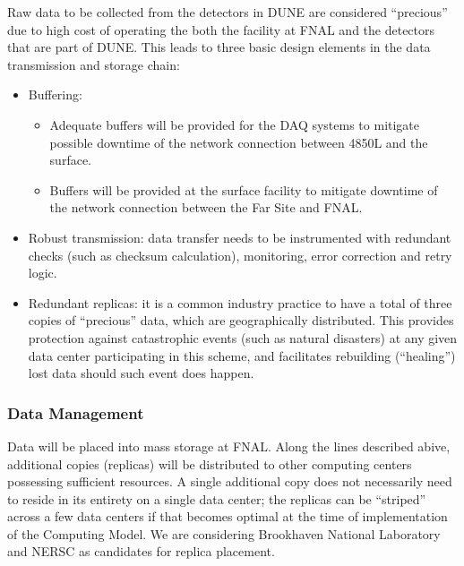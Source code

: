 Raw data to be collected from the detectors in DUNE are considered ``precious'' due to high cost of operating the both the facility at FNAL
and the detectors that are part of DUNE. This leads to three basic design elements in the data transmission and storage chain:
\begin{itemize}
\item Buffering:
\begin{itemize}
\item Adequate buffers will be provided for the DAQ systems  to mitigate possible downtime of the network connection between 4850L and the surface.
\item Buffers will be provided at the surface facility to mitigate downtime of the network connection between the Far Site and FNAL.
\end{itemize}
\item Robust transmission: data transfer needs to be instrumented with redundant checks (such as checksum calculation), monitoring, error correction and retry logic.
\item Redundant replicas: it is a common industry practice to have a total of three copies of ``precious'' data, which are geographically distributed. This provides protection against catastrophic events (such as natural disasters) at any given data center participating in this scheme, and facilitates rebuilding (``healing'')  lost data should such event does happen.
\end{itemize}



\subsubsection{Data Management}
\label{sec:detectors-sc-infrastructure-computing-model-data-mgt}

Data will be placed into mass storage at FNAL. Along the lines described abive, additional copies (replicas) will be distributed to other
computing centers possessing sufficient resources.
A single additional copy does not necessarily need to reside in its entirety on a single data center; the replicas can be ``striped'' across a few data centers if that becomes optimal
at the time of implementation of the Computing Model. We are considering Brookhaven National Laboratory and NERSC as candidates for replica placement.

